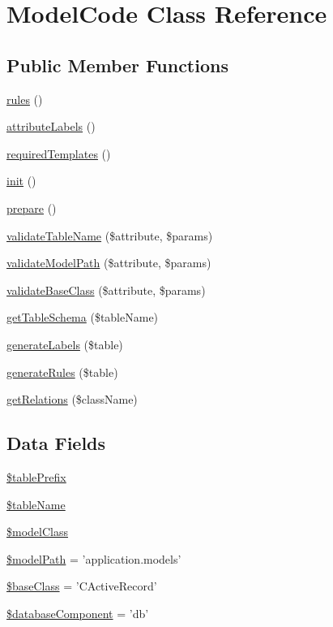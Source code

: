 \hypertarget{classModelCode}{
\section{ModelCode Class Reference}
\label{classModelCode}
}
\subsection*{Public Member Functions}
\begin{DoxyCompactItemize}
\item 
\hyperlink{classModelCode_a17dba92d96b9dd48c62f3ede3eef94d4}{rules} ()
\item 
\hyperlink{classModelCode_aae54d2938df6eac42a9a9020a64ae31b}{attributeLabels} ()
\item 
\hyperlink{classModelCode_aeb759ab8b65c078ab7455db4e42c585c}{requiredTemplates} ()
\item 
\hyperlink{classModelCode_a4be4055f3361d4800e16bc2e2e38cda6}{init} ()
\item 
\hyperlink{classModelCode_a9596f1635d3c078fa06ab0166bcbb11b}{prepare} ()
\item 
\hyperlink{classModelCode_a4a6d3897ac77e9586589fdd4d6e5ecf9}{validateTableName} (\$attribute, \$params)
\item 
\hyperlink{classModelCode_af93ad690038df66799f9ddd39364e8d0}{validateModelPath} (\$attribute, \$params)
\item 
\hyperlink{classModelCode_ac532afcf2e4495bba874d71b56c59508}{validateBaseClass} (\$attribute, \$params)
\item 
\hyperlink{classModelCode_a5eac2a49f496d7dd3bb5c85125d721b1}{getTableSchema} (\$tableName)
\item 
\hyperlink{classModelCode_af6d7c7e90de1505aa2ce2da6cbc5857c}{generateLabels} (\$table)
\item 
\hyperlink{classModelCode_a3c33fb60a7ac31271b9479cbda88578a}{generateRules} (\$table)
\item 
\hyperlink{classModelCode_a04e057d2d5a8d5abf778dda06374d723}{getRelations} (\$className)
\end{DoxyCompactItemize}
\subsection*{Data Fields}
\begin{DoxyCompactItemize}
\item 
\hyperlink{classModelCode_a061ded67e1c12c266312830d080f46a7}{\$tablePrefix}
\item 
\hyperlink{classModelCode_aea06aaf672e3fe5fbf45958ae2782244}{\$tableName}
\item 
\hyperlink{classModelCode_aaba2952ca851db29e7fffe58808aa4aa}{\$modelClass}
\item 
\hyperlink{classModelCode_a349ce28f73e8c77a58b4f0eca3f4252b}{\$modelPath} = 'application.models'
\item 
\hyperlink{classModelCode_a190491cf77e760fce1f6a9c9f226a18e}{\$baseClass} = 'CActiveRecord'
\item 
\hyperlink{classModelCode_a87a1491288adbff7947ce1bb223dcd3a}{\$databaseComponent} = 'db'
\end{DoxyCompactItemize}
